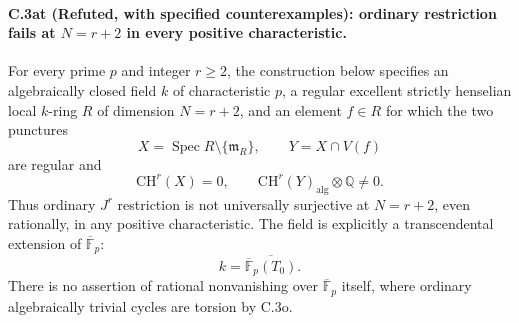 \paragraph{C.3at (Refuted, with specified counterexamples): ordinary restriction fails at $N=r+2$ in every positive characteristic.}
For every prime $p$ and integer $r\ge2$, the construction below specifies
an algebraically closed field $k$ of characteristic $p$, a regular
excellent strictly henselian local $k$-ring $R$ of dimension $N=r+2$,
and an element $f\in R$ for which the two punctures
\[
 X=\operatorname{Spec}R\setminus\{\mathfrak m_R\},
 \qquad Y=X\cap V(f)
\]
are regular and
\[
 \mathrm{CH}^r(X)=0,
 \qquad
 \mathrm{CH}^r(Y)_{\mathrm{alg}}\otimes\mathbb Q\ne0.
\]
Thus ordinary $J^r$ restriction is not universally surjective at
$N=r+2$, even rationally, in any positive characteristic. The field is
explicitly a transcendental extension of $\overline{\mathbb F}_p$:
\[
             k=\overline{\overline{\mathbb F}_p(T_0)}.
\]
There is no assertion of rational nonvanishing over
$\overline{\mathbb F}_p$ itself, where ordinary algebraically trivial
cycles are torsion by C.3o.

